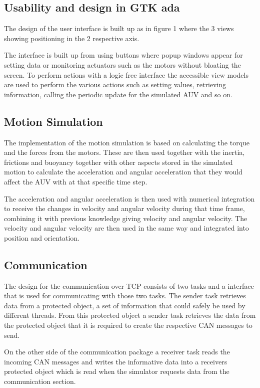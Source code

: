 \subsection{Usability and design in GTK ada}


The design of the user interface is built up as in figure 1 where the 3 views showing positioning in the 2 respective axis.

The interface is built up from using buttons where popup windows appear for setting data or monitoring actuators such as the motors without bloating the screen. To perform actions with a logic free interface the accessible view models are used to perform the various actions such as setting values, retrieving information, calling the periodic update for the simulated AUV and so on.

\subsection{Motion Simulation}
The implementation of the motion simulation is based on calculating the torque and the forces from the motors. These are then used together with the inertia, frictions and buoyancy together with other aspects stored in the simulated motion to calculate the acceleration and angular acceleration that they would affect the AUV with at that specific time step.
 
The acceleration and angular acceleration is then used with numerical integration to receive the changes in velocity and angular velocity during that time frame, combining it with previous knowledge giving velocity and angular velocity. The velocity and angular velocity are then used in the same way and integrated into position and orientation. 

\subsection{Communication}

The design for the communication over TCP consists of two tasks and a interface that is used for communicating with those two tasks. The sender task retrieves data from a protected object, a set of information that could safely be used by different threads. From this protected object a sender task retrieves the data from the protected object that it is required to create the respective CAN messages to send.

On the other side of the communication package a receiver task reads the incoming CAN messages and writes the informative data into a receivers protected object which is read when the simulator requests data from the communication section.

